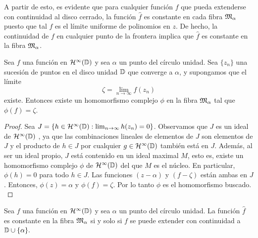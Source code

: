 A partir de esto, es evidente que para cualquier función $f$ que pueda extenderse con continuidad al disco cerrado, la función $\widehat f$ es constante en cada fibra $\mathfrak{M}_\alpha$ puesto que tal $f$ es el límite uniforme de polinomios en $z$. De hecho, la continuidad de $f$ en cualquier punto de la frontera implica que $\widehat f$ es constante en la fibra $\mathfrak{M}_\alpha$. \\

\begin{theorem}
    \label{th:result1}
    Sea $f$ una función en $\mathcal{H}^{\infty}(\mathbb{D})$ y sea $\alpha$ un punto del círculo unidad. Sea $\{z_n\}$ una sucesión de puntos en el disco unidad $\mathbb{D}$ que converge a $\alpha$, y supongamos que el límite
    \begin{equation*}
        \zeta = \lim_{n \to \infty} f(z_n)
    \end{equation*}
    existe. Entonces existe un homomorfismo complejo $\phi$ en la fibra $\mathfrak{M}_\alpha$ tal que $\phi(f) = \zeta$.
\end{theorem}

\begin{proof}
    Sea $J = \{h\in \mathcal{H}^{\infty}(\mathbb{D}) : \lim_{n \to \infty} h(z_n) = 0 \}$. Observamos que $J$ es un ideal de $\mathcal{H}^{\infty}(\mathbb{D})$ , ya que las combinaciones lineales de elementos de $J$ son elementos de $J$ y el producto de $h \in J$ por cualquier $g \in \mathcal{H}^{\infty}(\mathbb{D})$ también está en $J$. Además, al ser un ideal propio, $J$ está contenido en un ideal maximal $M$, esto es, existe un homomorfismo complejo $\phi$ de  $\mathcal{H}^{\infty}(\mathbb{D})$ del que $M$ es el núcleo. En particular, $\phi(h) = 0$ para todo $h \in J$. Las funciones $(z - \alpha)$ y $(f - \zeta)$ están ambas en $J$. Entonces, $\phi(z) = \alpha$ y $\phi(f) = \zeta$. Por lo tanto $\phi$ es el homomorfismo buscado. \\ %
\end{proof}

\begin{theorem}
    Sea $f$ una función en $\mathcal{H}^{\infty}(\mathbb{D})$ y sea $\alpha$ un punto del círculo unidad. La función $\widehat f$ es constante en la fibra $\mathfrak{M}_\alpha$ si y solo si $f$ se puede extender con continuidad a $\mathbb{D} \cup \{\alpha\}.$
\end{theorem}

